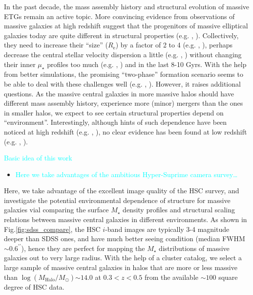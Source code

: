 \documentclass{emulateapj}
\def\arcsec{{\prime\prime}}
\def\mstar{{$M_{\star}$}}
\def\logmh{{$\log (M_{\mathrm{Halo}}/M_{\odot})$}}
\def\mden{{$\mu_{\star}$}}
\newcommand{\plan}[1]{\textcolor{cyan}{#1}}
\newcommand{\update}[1]{\textcolor{Bittersweet}{#1}}
\begin{document}
\begin{CJK*}{UTF8}{gbsn}
    \update{
    In the past decade, the mass assembly history and structural evolution of massive 
    ETGs remain an active topic.  
    More convincing evidence from observations of massive galaxies at high redshift 
    suggest that the progenitors of massive elliptical galaxies today are quite different 
    in structural properties (e.g. \citealt{Bezanson2009}, \citealt{vanDokkum2010}).  
    Collectively, they need to increase their ``size'' ($R_{\mathrm{e}}$) by a factor 
    of 2 to 4 (e.g. \citealt{Newman2012}, \citealt{vdWel2014}), perhaps decrease the 
    central stellar velocity dispersion a little (e.g. \citealt{vandeSande2011}, 
    \citealt{Belli2014}) without changing their inner \mden{} profiles too much 
    (e.g. \citealt{Szomoru2012}, \citealt{Patel2013}) and  in the last 8-10 Gyrs.  
    With the help from better simulations, the promising ``two-phase'' formation 
    scenario seems to be able to deal with these challenges well (e.g. 
    \citealt{Oser2010}, \citealt{Oser2012}).
    However, it raises additional questions.
    As the massive central galaxies in more massive halos should have different mass 
    assembly history, experience more (minor) mergers than the ones in smaller halos, 
    we expect to see certain structural properties depend on ``environment''. 
    Interestingly, although hints of such dependence have been noticed at high redshift 
    (e.g. \citealt{Papovich2012}, \citealt{Delaye2014}), no clear evidence has been found 
    at low redshift (e.g. \citealt{Nair2010}, \citealt{HCompany13}). 
    }
    
    \plan{Basic idea of this work}
    \begin{itemize}
        \item \plan{Here we take advantages of the ambitious Hyper-Suprime camera 
            survey\ldots}
    \end{itemize}
        
    \update{Here, we take advantage of the excellent image quality of the HSC survey, and 
    investigate the potential environmental dependence of structure for massive galaxies 
    vial comparing the surface \mstar{} density profiles and structural scaling relations 
    between massive central galaxies in different environments. 
    As shown in Fig.\ref{fig:sdss_compare}, the HSC $i$-band images are typically 3-4 
    magnitude deeper than SDSS ones, and have much better seeing condition 
    (median FWHM$\sim 0.6^{\arcsec}$), hence they are perfect for mapping the \mstar{}
    distributions of massive galaxies out to very large radius. 
    With the help of a cluster catalog, we select a large sample of massive central 
    galaxies in halos that are more or less massive than \logmh{}$\sim 14.0$ at 
    $0.3 < z < 0.5$ from the available $\sim 100$ square degree of HSC data.}
    

\end{CJK*}
\end{document}
